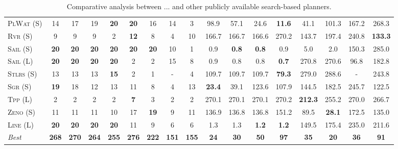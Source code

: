 \begin{table}[tb]
{\begin{tabular}{|l||cccccccc||cccccccc||}
\textsc{PlWat} (S)&14&17&19&\textbf{20}&\textbf{20}&16&14&3&98.9&57.1&24.6&\textbf{11.6}&41.1&101.3&167.2&268.3\\
\textsc{Rvr} (S)&9&9&9&2&\textbf{12}&8&4&10&166.7&166.7&166.6&270.2&143.7&197.4&240.8&\textbf{133.3}\\
\textsc{Sail} (S)&\textbf{20}&\textbf{20}&\textbf{20}&\textbf{20}&\textbf{20}&\textbf{20}&10&1&0.9&\textbf{0.8}&\textbf{0.8}&0.9&5.0&2.0&150.3&285.0\\
\textsc{Sail} (L)&\textbf{20}&\textbf{20}&\textbf{20}&\textbf{20}&2&2&15&8&0.9&0.8&0.8&\textbf{0.7}&270.8&270.6&96.8&182.8\\
\textsc{Stlrs} (S)&13&13&13&\textbf{15}&2&1&-&4&109.7&109.7&109.7&\textbf{79.3}&279.0&288.6&-&243.8\\
\textsc{Sgr} (S)&\textbf{19}&18&12&13&11&8&4&13&\textbf{23.4}&39.1&123.6&107.9&144.5&182.5&245.7&122.5\\
\textsc{Tpp} (L)&2&2&2&2&\textbf{7}&3&2&2&270.1&270.1&270.1&270.2&\textbf{212.3}&255.2&270.0&266.7\\
\textsc{Zeno} (S)&11&11&11&10&17&\textbf{19}&9&11&136.9&136.8&136.8&151.2&89.5&\textbf{28.1}&172.5&135.0\\
\textsc{Line} (L)&\textbf{20}&\textbf{20}&\textbf{20}&\textbf{20}&11&9&6&6&1.3&1.3&\textbf{1.2}&\textbf{1.2}&149.5&175.4&235.0&211.6
\\\hline
\textit{Best}&\textbf{268}&\textbf{270}&\textbf{264}&\textbf{255}&\textbf{276}&\textbf{222}&\textbf{151}&\textbf{155}&\textbf{24}&\textbf{30}&\textbf{50}&\textbf{97}&\textbf{35}&\textbf{20}&\textbf{36}&\textbf{91}\\\hline

        \end{tabular}}
        \caption{Comparative analysis between ... and other publicly available search-based planners.}
        \label{tab:search}
        \end{table}
        